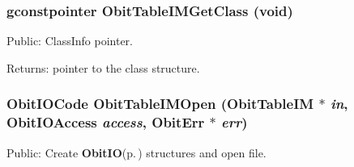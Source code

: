 \subsubsection{\setlength{\rightskip}{0pt plus 5cm}gconstpointer Obit\-Table\-IMGet\-Class (void)}\label{ObitTableIM_8h_a13}


Public: Class\-Info pointer. 

\begin{Desc}
\item[Returns:]pointer to the class structure. \end{Desc}
\subsubsection{\setlength{\rightskip}{0pt plus 5cm}Obit\-IOCode Obit\-Table\-IMOpen ({\bf Obit\-Table\-IM} $\ast$ {\em in}, Obit\-IOAccess {\em access}, {\bf Obit\-Err} $\ast$ {\em err})}\label{ObitTableIM_8h_a17}


Public: Create {\bf Obit\-IO}{\rm (p.\,\pageref{structObitIO})} structures and open file. 

